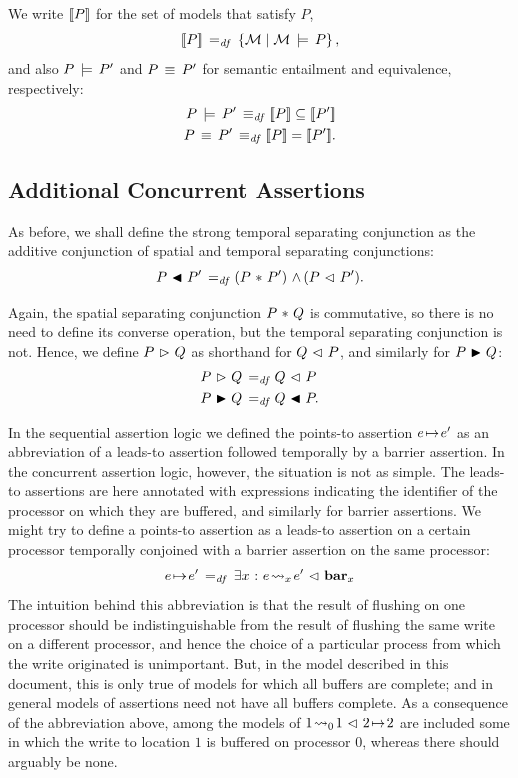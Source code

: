 \documentclass[11pt]{report}         %
\begin{document}
We write $[\![P]\!]$ for the set of models that satisfy $P$,\[ [\![P]\!] \operatorname{\;=_{\mathit{df}}\;} \left\lbrace \mathcal{M} \mid \mathcal{M} \,\models\, P \right\rbrace,\] and also $P \,\models\, P'$ and $P \,\equiv\, P'$ for semantic entailment and equivalence, respectively: \begin{align*}
      P \sentails P' \iffdef \pred{P} \subseteq \pred{P'} \\
      P \sequiv P' \iffdef \pred{P} = \pred{P'}.
\end{align*} 


\subsection{Additional Concurrent Assertions} 

As before, we shall define the strong temporal separating conjunction as the additive conjunction of spatial and temporal separating conjunctions: \[ P \operatorname{\,\blacktriangleleft\,} P' \operatorname{\;=_{\mathit{df}}\;} (P \operatorname{\,\ast\,} P') \operatorname{\,\wedge\,} (P \operatorname{\,\vartriangleleft\,} P').\]

Again, the spatial separating conjunction $P \operatorname{\,\ast\,} Q$ is commutative, so there is no need to define its converse operation, but the temporal separating conjunction is not. Hence, we define $P \operatorname{\,\vartriangleright\,} Q$ as shorthand for $Q \operatorname{\,\vartriangleleft\,} P$, and similarly for $P \operatorname{\,\blacktriangleright\,} Q$: \begin{align*}
  P \operatorname{\,\vartriangleright\,} Q \operatorname{\;=_{\mathit{df}}\;} & Q \operatorname{\,\vartriangleleft\,} P \\ 
  P \operatorname{\,\blacktriangleright\,} Q \operatorname{\;=_{\mathit{df}}\;} & Q \operatorname{\,\blacktriangleleft\,} P.
\end{align*}

In the sequential assertion logic we defined the points-to assertion $e \!\mapsto\! e'$ as an abbreviation of a leads-to assertion followed temporally by a barrier assertion. In the concurrent assertion logic, however, the situation is not as simple. The leads-to assertions are here annotated with expressions indicating the identifier of the processor on which they are buffered, and similarly for barrier assertions. We might try to define a points-to assertion as a leads-to assertion on a certain processor temporally conjoined with a barrier assertion on the same processor: \[
  e \!\mapsto\! e' \operatorname{\;=_{\mathit{df}}\;} \exists x \operatorname{\,:\,} e \!\leadsto_{x}\! e' \operatorname{\,\vartriangleleft\,} \mathbf{bar}_{x}
\] The intuition behind this abbreviation is that the result of flushing on one processor should be indistinguishable from the result of flushing the same write on a different processor, and hence the choice of a particular process from which the write originated is unimportant. But, in the model described in this document, this is only true of models for which all buffers are complete; and in general models of assertions need not have all buffers complete. As a consequence of the abbreviation above, among the models of $1 \!\leadsto_{0}\! 1 \operatorname{\,\vartriangleleft\,} 2 \!\mapsto\! 2$ are included some in which the write to location $1$ is buffered on processor 0, whereas there should arguably be none. 
\end{document}
